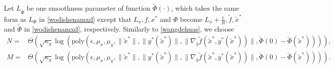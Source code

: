 \documentclass{osudissert96}
\begin{document}
Let $L_{\widetilde \Phi}$ be one smoothness parameter of function $\widetilde \Phi(\cdot)$, which takes the same form as $L_\Phi$ in \cref{wodishenamxd} except that $L_x,f,x^*$ and $\Phi$ become $L_x+\frac{\epsilon}{R},\widetilde f,\widetilde x^*$ and $\widetilde \Phi$ in \cref{wodishenamxd}, respectively. Similarly to \cref{wangdehuas}, we choose  
\begin{align}\label{michiganletgo}
N=&\Theta(\sqrt{\kappa_y}\log (\text{poly}(\epsilon,\mu_x,\mu_y,\|\widetilde x^*\|,\|y^*(\widetilde x^*)\|,\|\nabla_y \widetilde f(\widetilde x^*,y^*(\widetilde x^*))\|,\widetilde \Phi(0) -\widetilde \Phi(\widetilde x^*)))), \nonumber
\\M=&\Theta(\sqrt{\kappa_y}\log (\text{poly}(\epsilon,\mu_x,\mu_y,\|\widetilde x^*\|,\|y^*(\widetilde x^*)\|,\|\nabla_y \widetilde f(\widetilde x^*,y^*(\widetilde x^*))\|,\widetilde \Phi(0) -\widetilde \Phi(\widetilde x^*) ))).
\end{align} 
\end{document}
